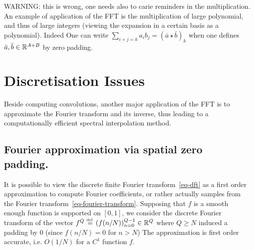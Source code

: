 WARNING: this is wrong, one needs also to carie reminders in the multiplication. 
An example of application of the FFT is the multiplication of large polynomial, and thus of large integers (viewing the expansion in a certain basis as a polynomial). Indeed
One can write $\sum_{i+j=k} a_i b_j = (\bar a \star \bar b)_k$ when one defines $\bar a,\bar b \in \mathbb{R}^{A+B}$ by zero padding. 


\section{Discretisation Issues}
\label{sec-fourier-discretization}

Beside computing convolutions, another major application of the FFT is to approximate the Fourier transform and its inverse, thus leading to a computationally efficient spectral interpolation method.


\subsection{Fourier approximation via spatial zero padding.}

It is possible to view the discrete finite Fourier transform~\eqref{eq-dft} as a first order approximation to compute Fourier coefficients, or rather actually samples from the Fourier transform~\eqref{eq-fourier-transform}. Supposing that $f$ is a smooth enough function is supported on $[0,1]$, we consider the discrete Fourier transform of the vector $f^Q \stackrel{\mbox{\upshape\tiny def.}}{=} (f(n/N))_{n=0}^{Q-1} \in \mathbb{R}^Q$  where $Q \geq N$ induced a padding by $0$ (since $f(n/N)=0$ for $n > N$)
The approximation is first order accurate, i.e. $O(1/N)$ for a $C^1$ function $f$. 

